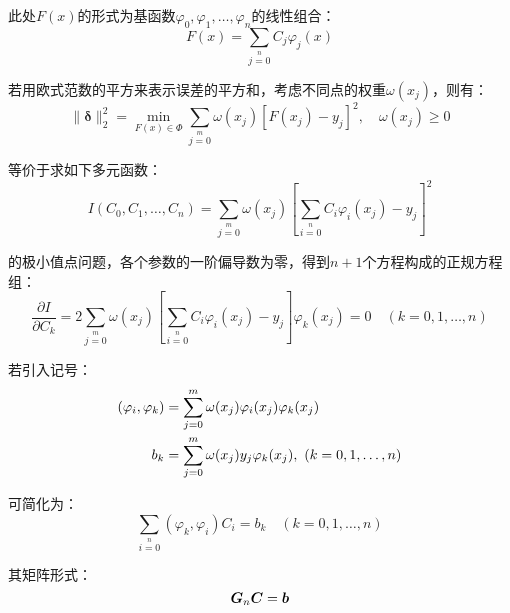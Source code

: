 \begin{enumerate}
	此处$F(x)$的形式为基函数$\varphi_0,\varphi_1,\dots,\varphi_n$的线性组合：
	\begin{equation}
	F(x) = \sum\limits_{j=0}\limits^n C_j \varphi_j(x)
	\end{equation}

	若用欧式范数的平方来表示误差的平方和，考虑不同点的权重$\omega(x_j)$，则有：
	\begin{equation}
	\| \boldsymbol{\delta} \|_2 ^2 = \min\limits_{F(x)\in \varPhi}\sum\limits_{j=0}\limits^m \omega(x_j)[F(x_j)-y_j]^2,\quad \omega(x_j) \geqslant 0
	\end{equation}

	等价于求如下多元函数：
	\begin{equation}
	I(C_0,C_1,\dots,C_n) = \sum\limits_{j=0}\limits^m\omega(x_j)[\sum\limits_{i=0}\limits^n C_i \varphi_i(x_j) - y_j]^2
	\end{equation}

	的极小值点问题，各个参数的一阶偏导数为零，得到$n+1$个方程构成的正规方程组：
	\begin{equation}
	\frac{\partial I}{\partial C_k} = 2\sum\limits_{j=0}\limits^m\omega(x_j)[\sum\limits_{i=0}\limits^n C_i \varphi_i(x_j) - y_j]\varphi_k(x_j) = 0 \quad (k=0,1,\dots,n)
	\end{equation}

	若引入记号：
	\begin{align}
	(\varphi_i,\varphi_k) &= \sum\limits_{j=0}\limits^m\omega(x_j)\varphi_i(x_j)\varphi_k(x_j)\notag \\
	b_k& = \sum\limits_{j=0}\limits^m\omega(x_j)y_j\varphi_k(x_j),\ (k=0,1,\dots,n)\notag
	\end{align}

	可简化为：
	\begin{equation}
	\sum\limits_{i=0}\limits^n(\varphi_k,\varphi_i)C_i = b_k \quad (k=0,1,\dots,n)
	\end{equation}

	其矩阵形式：
	\begin{equation}
	\boldsymbol{G}_n\boldsymbol{C} = \boldsymbol{b} \\
	\end{equation}
	

\end{enumerate}

